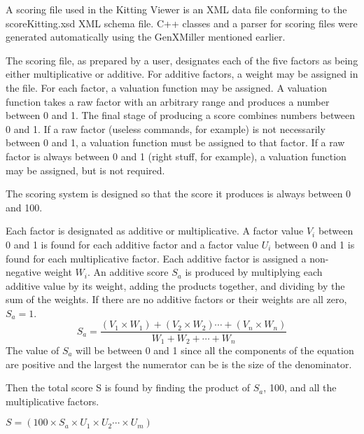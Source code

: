 A scoring file used in the Kitting Viewer is an XML data file conforming to
the scoreKitting.xsd XML schema file. C++ classes and a parser for scoring
files were generated automatically using the GenXMiller mentioned earlier.

The scoring file, as prepared by a user, designates each of the five
factors as being either multiplicative or additive. For additive factors, a
weight may be assigned in the file. For each factor, a valuation function
may be assigned. A valuation function takes a raw factor with an arbitrary
range and produces a number between 0 and 1. The final stage of producing
a score combines numbers between 0 and 1. If a raw factor (useless
commands, for example) is not necessarily between 0 and 1, a valuation
function must be assigned to that factor. If a raw factor is always between
0 and 1 (right stuff, for example), a valuation function may be assigned,
but is not required.

The scoring system is designed so that the score it produces is always
between 0 and 100.

Each factor is designated as additive or multiplicative. A factor
value $V_i$ between 0 and 1 is found for each additive factor and a
factor value $U_i$ between 0 and 1 is found for each multiplicative
factor. Each additive factor is assigned a non-negative weight $W_i$. An
additive score $S_a$ is produced by multiplying each additive value by
its weight, adding the products together, and dividing by the sum of the
weights. If there are no additive factors or their weights are all
zero, $S_a = 1$.
\[
S_a = \frac{(V_1\times W_1)+(V_2\times W_2)\cdots + (V_n\times W_n)}{W_1+W_2+\cdots+W_n}
\]
The value of $S_a$ will be between 0 and 1 since all the components of the
equation are positive and the largest the numerator can be is the size
of the denominator.

Then the total score S is found by finding the product of $S_a$, 100, and
all the multiplicative factors.

$S = (100\times S_a\times U_1\times U_2\cdots \times U_m)$



